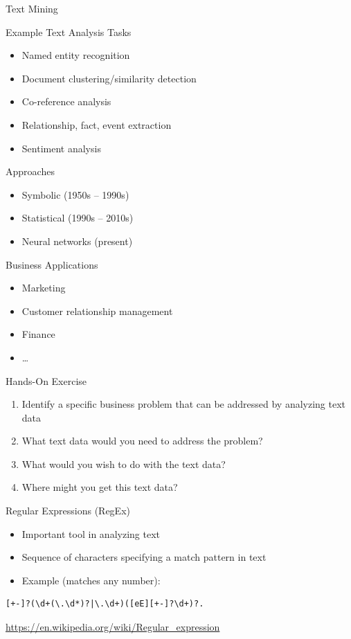 \documentclass[ignorenonframetext,xcolor=x11names]{beamer}
\begin{document}
\begin{frame}[allowframebreaks]{Text Mining}
\begin{block}{Example Text Analysis Tasks}
\begin{itemize}
	\item Named entity recognition
	\item Document clustering/similarity detection
	\item Co-reference analysis
	\item Relationship, fact, event extraction
	\item Sentiment analysis
\end{itemize}
\end{block}
\begin{block}{Approaches}
\begin{itemize}
	\item Symbolic (1950s -- 1990s)
	\item Statistical (1990s -- 2010s)
	\item Neural networks (present)
\end{itemize}
\end{block}
\begin{block}{Business Applications}
\begin{itemize}
	\item Marketing
	\item Customer relationship management
	\item Finance
	\item \ldots
\end{itemize}
\end{block}
\begin{block}{Hands-On Exercise}
\begin{enumerate}
	\item Identify a specific business problem that can be addressed by analyzing text data
	\item What text data would you need to address the problem?
	\item What would you wish to do with the text data?
	\item Where might you get this text data?
\end{enumerate}
\end{block}
\end{frame}

\begin{frame}[fragile]{Regular Expressions (RegEx)}
\begin{itemize}
	\item Important tool in analyzing text
	\item Sequence of characters specifying a match pattern in text
	\item Example (matches any number):
\end{itemize}
\begin{verbatim}
[+-]?(\d+(\.\d*)?|\.\d+)([eE][+-]?\d+)?.
\end{verbatim}
\tiny{\url{https://en.wikipedia.org/wiki/Regular\_expression}}
\end{frame}
\end{document}
